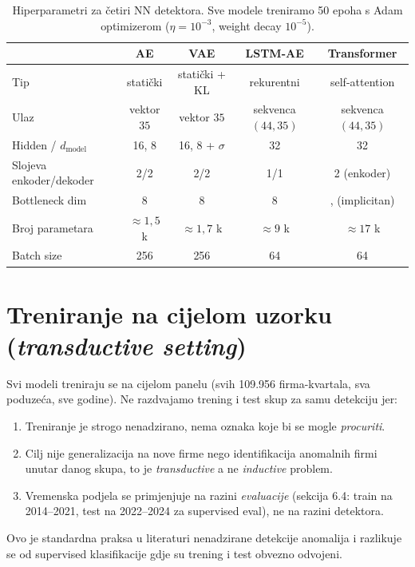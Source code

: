\documentclass[diplomskirad,authoryear]{fer}
\begin{document}
\begin{table}[h]
\centering
\caption{Hiperparametri za četiri NN detektora. Sve modele treniramo 50 epoha s Adam optimizerom ($\eta=10^{-3}$, weight decay $10^{-5}$).}
\label{tab:model_params}
\begin{tabular}{lcccc}
\toprule
 & \textbf{AE} & \textbf{VAE} & \textbf{LSTM-AE} & \textbf{Transformer} \\
\midrule
Tip & statički & statički + KL & rekurentni & self-attention \\
Ulaz & vektor $35$ & vektor $35$ & sekvenca $(44,35)$ & sekvenca $(44,35)$ \\
Hidden / $d_{\text{model}}$ & 16, 8 & 16, 8 + $\sigma$ & 32 & 32 \\
Slojeva enkoder/dekoder & 2/2 & 2/2 & 1/1 & 2 (enkoder) \\
Bottleneck dim & 8 & 8 & 8 &, (implicitan) \\
Broj parametara & $\approx 1{,}5$ k & $\approx 1{,}7$ k & $\approx 9$ k & $\approx 17$ k \\
Batch size & 256 & 256 & 64 & 64 \\
\bottomrule
\end{tabular}
\end{table}

\section{Treniranje na cijelom uzorku (\emph{transductive setting})}

Svi modeli treniraju se na cijelom panelu (svih 109.956 firma-kvartala, sva poduzeća, sve godine). Ne razdvajamo trening i test skup za samu detekciju jer:
\begin{enumerate}
 \item Treniranje je strogo nenadzirano, nema oznaka koje bi se mogle \emph{procuriti}.
 \item Cilj nije generalizacija na nove firme nego identifikacija anomalnih firmi unutar danog skupa, to je \emph{transductive} a ne \emph{inductive} problem.
 \item Vremenska podjela se primjenjuje na razini \emph{evaluacije} (sekcija 6.4: train na 2014--2021, test na 2022--2024 za supervised eval), ne na razini detektora.
\end{enumerate}

Ovo je standardna praksa u literaturi nenadzirane detekcije anomalija \citep{aggarwal2017} i razlikuje se od supervised klasifikacije gdje su trening i test obvezno odvojeni.
\end{document}
